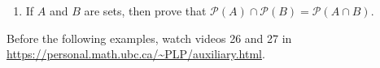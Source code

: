 \documentclass[12pt]{article}
\begin{document}
\begin{enumerate}
%
%
%
%
%
%
%
%

\item If $A$ and $B$ are sets, then prove that $\mathcal{P}(A)\cap\mathcal{P}(B) = \mathcal{P}(A\cap B)$.

%
%
%
\end{enumerate}

Before the following examples, watch videos 26 and 27 in \url{https://personal.math.ubc.ca/~PLP/auxiliary.html}.
\end{document}
